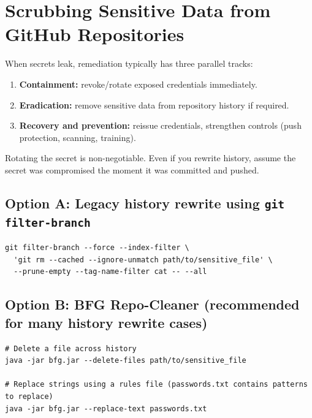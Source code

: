 \documentclass[11pt]{article}
\begin{document}
\section{Scrubbing Sensitive Data from GitHub Repositories}

When secrets leak, remediation typically has three parallel tracks:

\begin{enumerate}[leftmargin=*,itemsep=2pt]
  \item \textbf{Containment:} revoke/rotate exposed credentials immediately.
  \item \textbf{Eradication:} remove sensitive data from repository history if required.
  \item \textbf{Recovery and prevention:} reissue credentials, strengthen controls (push protection, scanning, training).
\end{enumerate}

\begin{warningbox}
Rotating the secret is non-negotiable. Even if you rewrite history, assume the secret was compromised the moment it was committed and pushed.
\end{warningbox}

\subsection{Option A: Legacy history rewrite using \texttt{git filter-branch}}
\begin{examplebox}[title={Remove a sensitive file using \texttt{git filter-branch} (legacy)}]
\begin{verbatim}
git filter-branch --force --index-filter \
  'git rm --cached --ignore-unmatch path/to/sensitive_file' \
  --prune-empty --tag-name-filter cat -- --all
\end{verbatim}
\end{examplebox}

\subsection{Option B: BFG Repo-Cleaner (recommended for many history rewrite cases)}
\begin{examplebox}[title={BFG: delete files or replace secret strings}]
\begin{verbatim}
# Delete a file across history
java -jar bfg.jar --delete-files path/to/sensitive_file

# Replace strings using a rules file (passwords.txt contains patterns to replace)
java -jar bfg.jar --replace-text passwords.txt
\end{verbatim}
\end{examplebox}
\end{document}
